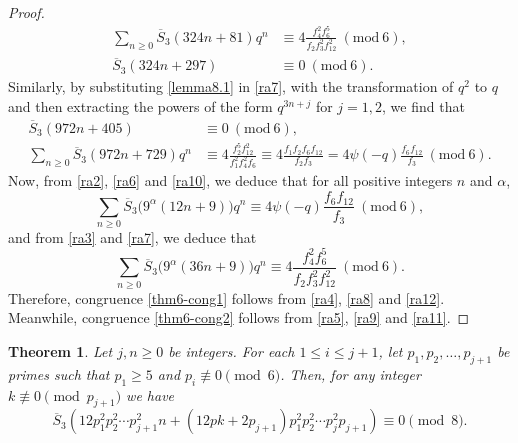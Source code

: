 \documentclass[12pt]{amsart}
\newcommand{\sst}{\overline{S}}
\theoremstyle{plain}
\newtheorem{theorem}{Theorem}[section]
\theoremstyle{definition}
\begin{document}
\begin{proof}
\begin{align}
\sum_{n \geq 0} \overline{S}_{3}(324n+81) q^{n} &\equiv 4\frac{f_{4}^{2} f_{6}^{5}}{f_{2} f_{3}^{2} f_{12}^{2}} \ (\mathrm{mod} \ 6), \label{ra7}\\
\overline{S}_{3}(324n+297)  &\equiv 0  \ (\mathrm{mod} \ 6). \label{ra8}
\end{align}
Similarly, by substituting \eqref{lemma8.1} in \eqref{ra7}, with the transformation of $q^2$ to $q$ and then extracting the powers of the form $q^{3n+j}$ for $j=1,2$, we find that
\begin{align}
\overline{S}_{3}(972n+405) &\equiv 0 \ (\mathrm{mod} \ 6), \label{ra9}\\
\sum_{n \geq 0} \overline{S}_{3}(972n+729) q^{n} &\equiv 4 \frac{f_{2}^{5} f_{12}^{2}}{f_{1}^{2} f_{4}^{2} f_{6}} \equiv 4  \frac{f_{1} f_{2} f_{6} f_{12}}{f_{2} f_{3}} = 4 \psi(-q) \frac{f_{6} f_{12}}{f_{3}} \ (\mathrm{mod} \ 6). \label{ra10}
\end{align}
Now, from \eqref{ra2}, \eqref{ra6} and \eqref{ra10}, we deduce that for all positive integers $n$ and $\alpha$,
\begin{equation}
\sum_{n \geq 0} \overline{S}_{3} \big( 9^{\alpha} (12n+9) \big) q^{n} \equiv 4 \psi(-q) \frac{f_{6} f_{12}}{f_{3}}  \ (\mathrm{mod} \ 6), \label{ra11}
\end{equation}
and from \eqref{ra3} and \eqref{ra7}, we deduce that
\begin{equation}
\sum_{n \geq 0} \overline{S}_{3} \big( 9^{\alpha} (36n+9) \big) q^{n} \equiv 4 \frac{f_{4}^{2} f_{6}^{5}}{f_{2} f_{3}^{2} f_{12}^{2}} \ (\mathrm{mod} \ 6). \label{ra12}
\end{equation}
Therefore, congruence \eqref{thm6-cong1} follows from \eqref{ra4}, \eqref{ra8} and \eqref{ra12}. Meanwhile, congruence \eqref{thm6-cong2} follows from  \eqref{ra5}, \eqref{ra9} and \eqref{ra11}.
\end{proof}


\begin{theorem}\label{thm:mf}
    Let $j,n\geq 0$ be integers. For each $1\leq i\leq j+1$, let $p_1, p_2, \ldots, p_{j+1}$ be primes such that $p_1\geq 5$ and $p_i\not \equiv 0\pmod 6$. Then, for any integer $k\not \equiv 0\pmod{p_{j+1}}$ we have
    \[
    \sst_3(12p_1^2p_2^2\cdots p_{j+1}^2n+(12pk+2p_{j+1})p_1^2p_2^2\cdots p_j^2p_{j+1})\equiv 0 \pmod8.
    \]
\end{theorem}
\end{document}
